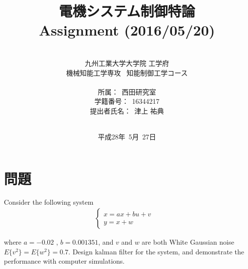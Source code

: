 \documentclass[a4paper,12pt]{jarticle}
\title{電機システム制御特論 \\
Assignment (2016/05/20)\\
}
\author{\vspace{40mm}\\
九州工業大学大学院 \hspace{0mm} 工学府\\
機械知能工学専攻\ \hspace{0mm} 知能制御工学コース \\
\vspace{5mm}\\
所属：\ 西田研究室\\
学籍番号：\ 16344217\\
提出者氏名：\ 津上 \hspace{0mm} 祐典\\\vspace{5mm}\\ }
\date{平成28年\ 5月\ 27日}
\begin{document}
\titlepage
\maketitle
\thispagestyle{empty}

\newpage

\thispagestyle{empty}
\tableofcontents

\newpage
\setcounter{page}{1}
\section{問題}
Consider the following system
%
\begin{eqnarray}
 \begin{cases}
  x = ax + bu + v & \\
  y = x + w
 \end{cases}
\end{eqnarray}
%

where $a=-0.02$ , $b=0.001351$, and $v$ and $w$ are both White Gaussian
noise $E \bigl\{ v^2 \bigr\} = E \bigl\{ w^2 \bigr\} = 0.7$.
Design kalman filter for the system, and demonstrate the performance
with computer simulations.

\end{document}
